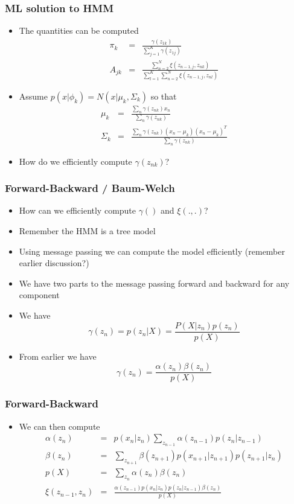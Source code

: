 \documentclass[10pt]{beamer}
\begin{document}
\begin{frame}
  \frametitle{ML solution to HMM}
  \begin{itemize}
  \item The quantities can be computed
    \begin{eqnarray*}
      \pi_k &=& \frac{\gamma(z_{1k})}{\sum_{j=1}^K \gamma(z_{1j})}\\
      A_{jk} &=& \frac{\sum_{n=2}^N \xi(z_{n-1,j}, z_{nk})}{
        \sum_{l=1}^K \sum_{n=2}^N \xi(z_{n-1,j}, z_{nl})}
    \end{eqnarray*}
  \item Assume $p(x|\phi_k) = N(x|\mu_k, \Sigma_k)$ so that
    \begin{eqnarray*}
      \mu_k &=& \frac{\sum_n \gamma(z_{nk}) x_n}{\sum_n
        \gamma(z_{nk})}\\
      \Sigma_k &=& \frac{\sum_n \gamma(z_{nk}) (x_n - \mu_k)(x_n - \mu_k)^T}{
        \sum_n \gamma(z_{nk})}
    \end{eqnarray*}
  \item How do we efficiently compute $\gamma(z_{nk})$?
  \end{itemize}
\end{frame}

\begin{frame}
  \frametitle{Forward-Backward / Baum-Welch}
  \begin{itemize}
  \item How can we efficiently compute $\gamma()$ and $\xi(.,.)$?
  \item Remember the HMM is a tree model
  \item Using message passing we can compute the model efficiently
    (remember earlier discussion?)
  \item We have two parts to the message passing forward and backward
    for any component
  \item We have
    \[
    \gamma(z_n) = p(z_n|X) = \frac{P(X|z_n) p(z_n)}{p(X)}
    \]
  \item From earlier we have
    \[
    \gamma(z_n) = \frac{\alpha(z_n)\beta(z_n)}{p(X)}
    \]
  \end{itemize}
\end{frame}

\begin{frame}
  \frametitle{Forward-Backward}
  \begin{itemize}
  \item We can then compute
    \begin{eqnarray*}
      \alpha(z_n) &=& p(x_n|z_n)\sum_{z_{n-1}} \alpha(z_{n-1}) p(z_n|z_{n-1})\\
      \beta(z_n) &=& \sum_{z_{n+1}} \beta(z_{n+1}) p(x_{n+1}|z_{n+1})
      p(z_{n+1}|z_n)\\
      p(X) &=& \sum_{z_n} \alpha(z_n)\beta(z_n)\\
      \xi(z_{n-1}, z_n) &=& \frac{\alpha(z_{n-1})p(x_n|z_n)p(z_n|z_{n-1})\beta(z_n)}{p(X)}
    \end{eqnarray*}
  \end{itemize}
\end{frame}
\end{document}
